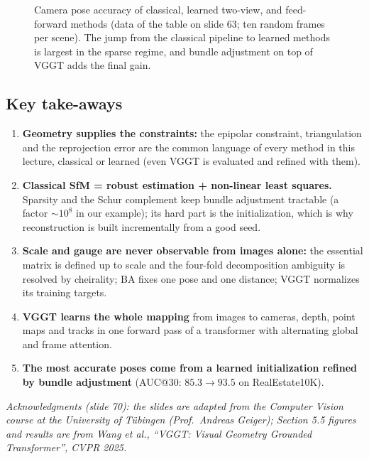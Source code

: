 \documentclass[11pt,a4paper]{article}
\begin{document}
\begin{figure}[H]
\centering
{}
\caption{Camera pose accuracy of classical, learned two-view, and feed-forward methods (data of the table on slide 63; ten random frames per scene). The jump from the classical pipeline to learned methods is largest in the sparse regime, and bundle adjustment on top of VGGT adds the final gain.}
\end{figure}

\subsection*{Key take-aways}
\begin{enumerate}
\item \textbf{Geometry supplies the constraints:} the epipolar constraint, triangulation and the reprojection error are the common language of every method in this lecture, classical or learned (even VGGT is evaluated and refined with them).
\item \textbf{Classical SfM = robust estimation + non-linear least squares.} Sparsity and the Schur complement keep bundle adjustment tractable (a factor $\sim10^8$ in our example); its hard part is the initialization, which is why reconstruction is built incrementally from a good seed.
\item \textbf{Scale and gauge are never observable from images alone:} the essential matrix is defined up to scale and the four-fold decomposition ambiguity is resolved by cheirality; BA fixes one pose and one distance; VGGT normalizes its training targets.
\item \textbf{VGGT learns the whole mapping} from images to cameras, depth, point maps and tracks in one forward pass of a transformer with alternating global and frame attention.
\item \textbf{The most accurate poses come from a learned initialization refined by bundle adjustment} (AUC@30: $85.3\to93.5$ on RealEstate10K).
\end{enumerate}

\vfill
\noindent\small\emph{Acknowledgments (slide 70): the slides are adapted from the Computer Vision course at the University of T\"ubingen (Prof.\ Andreas Geiger); Section 5.5 figures and results are from Wang et al., ``VGGT: Visual Geometry Grounded Transformer'', CVPR 2025.}
\end{document}
